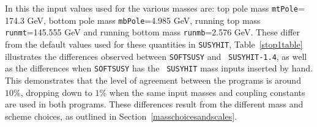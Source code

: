 \documentclass[final,3p,times,pdflatex]{elsarticle}
\def\code#1{{\tt #1}}
\begin{document}
In this the input values used for the various masses are: top pole mass \code{mtPole}=
174.3 GeV, bottom pole mass \code{mbPole}=4.985 GeV, running top mass 
\code{runmt}=145.555 GeV and running bottom mass \code{runmb}=2.576 GeV. These
differ from the default values used for these quantities in {\tt SUSYHIT},
Table~\ref{stop1table} 
illustrates the differences observed between {\tt SOFTSUSY} and {\tt
  SUSYHIT-1.4}, as well as the differences when {\tt SOFTSUSY} has the {\tt
  SUSYHIT} mass inputs inserted by hand. This demonstrates that the level of
agreement between the programs is around $10\%$, dropping down to $1\%$ when
the same input masses and coupling constants are used in both programs. These
differences result from the different mass and scheme choices,
as outlined in Section~\ref{masschoicesandscales}. 
\end{document}

